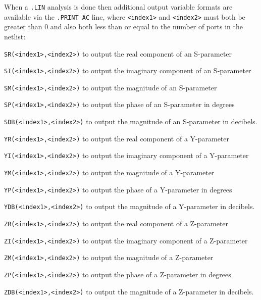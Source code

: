 When a \texttt{.LIN} analysis is done then additional output variable
formats are available via the \texttt{.PRINT AC} line, where
\texttt{<index1>} and \texttt{<index2>} must both be greater than 0
and also both less than or equal to the number of ports in the
netlist:
\begin{XyceItemize}
\item \texttt{SR(<index1>,<index2>)} to output the real component of an S-parameter
\item \texttt{SI(<index1>,<index2>)} to output the imaginary component of an S-parameter
\item \texttt{SM(<index1>,<index2>)} to output the magnitude of an S-parameter
\item \texttt{SP(<index1>,<index2>)} to output the phase of an S-parameter in degrees
\item \texttt{SDB(<index1>,<index2>)} to output the magnitude of an S-parameter in decibels.
\item \texttt{YR(<index1>,<index2>)} to output the real component of a Y-parameter
\item \texttt{YI(<index1>,<index2>)} to output the imaginary component of a Y-parameter
\item \texttt{YM(<index1>,<index2>)} to output the magnitude of a Y-parameter
\item \texttt{YP(<index1>,<index2>)} to output the phase of a Y-parameter in degrees
\item \texttt{YDB(<index1>,<index2>)} to output the magnitude of a Y-parameter in decibels.
\item \texttt{ZR(<index1>,<index2>)} to output the real component of a Z-parameter
\item \texttt{ZI(<index1>,<index2>)} to output the imaginary component of a Z-parameter
\item \texttt{ZM(<index1>,<index2>)} to output the magnitude of a Z-parameter
\item \texttt{ZP(<index1>,<index2>)} to output the phase of a Z-parameter in degrees
\item \texttt{ZDB(<index1>,<index2>)} to output the magnitude of a Z-parameter in decibels.
\end{XyceItemize}


